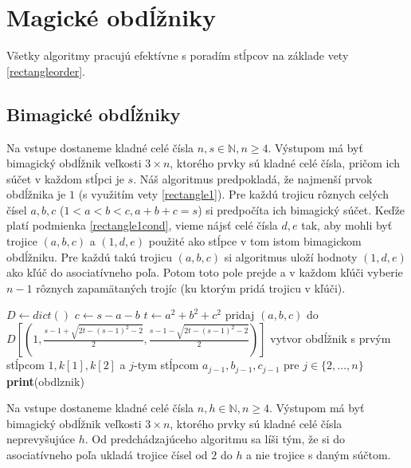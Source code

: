 \section{Magické obdĺžniky}

Všetky algoritmy pracujú efektívne s poradím stĺpcov na základe vety \ref{rectangleorder}.

\subsection{Bimagické obdĺžniky}

\begin{alg}
\label{algbos}
Na vstupe dostaneme kladné celé čísla $n,s \in \mathbb{N}, n \geq 4$. Výstupom má byť bimagický obdĺžnik veľkosti $3 \times n$, ktorého prvky sú kladné celé čísla, pričom ich súčet v každom stĺpci je $s$. Náš algoritmus predpokladá, že najmenší prvok obdĺžnika je $1$ (s využitím vety \ref{rectangle1}). Pre každú trojicu rôznych celých čísel $a,b,c$ ($1 < a < b < c, a+b+c = s$) si predpočíta ich bimagický súčet. Keďže platí podmienka \ref{rectangle1cond}, vieme nájsť celé čísla $d,e$ tak, aby mohli byť trojice $(a,b,c)$ a $(1,d,e)$ použité ako stĺpce v tom istom bimagickom obdĺžniku. Pre každú takú trojicu $(a,b,c)$ si algoritmus uloží hodnoty $(1,d,e)$ ako kľúč do asociatívneho poľa. Potom toto pole prejde a v každom kľúči vyberie $n-1$ rôznych zapamätaných trojíc (ku ktorým pridá trojicu v kľúči).
\end{alg}

\begin{algorithmic}
\STATE $D \gets dict()$
		\STATE $c \gets s-a-b$
		\STATE $t \gets a^2+b^2+c^2$
			\STATE pridaj $(a,b,c)$ do $D[(1, \frac{s-1 + \sqrt{2t - (s-1)^2 - 2}}{2}, \frac{s-1 - \sqrt{2t - (s-1)^2 - 2}}{2})]$
		\ENDIF
	\ENDFOR
\ENDFOR
{}
				\STATE vytvor obdĺžnik s prvým stĺpcom $1, k[1], k[2]$ a $j$-tym stĺpcom $a_{j-1}, b_{j-1}, c_{j-1}$ pre $j \in \{2, \dots , n\}$
					\STATE \textbf{print}(obdlznik)
				\ENDIF
			\ENDFOR
		\ENDIF
	\ENDFOR
\ENDFOR
\end{algorithmic}

\begin{alg}
\label{algboh}
Na vstupe dostaneme kladné celé čísla $n,h \in \mathbb{N}, n \geq 4$. Výstupom má byť bimagický obdĺžnik veľkosti $3 \times n$, ktorého prvky sú kladné celé čísla neprevyšujúce $h$. Od predchádzajúceho algoritmu sa líši tým, že si do asociatívneho poľa ukladá trojice čísel od $2$ do $h$ a nie trojice s daným súčtom.
\end{alg}

